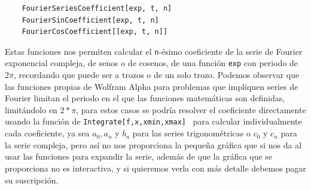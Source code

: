 \begin{verbatim}
	FourierSeriesCoefficient[exp, t, n]
	FourierSinCoefficient[exp, t, n]
	FourierCosCoefficient[[exp, t, n]]
\end{verbatim} 
Estas funciones nos permiten calcular el \texttt{n}-ésimo coeficiente de la serie de Fourier exponencial compleja, de senos o de cosenos, de una función \texttt{exp} con periodo de $2\pi$, recordando que puede ser a trozos o de un solo trozo. \newline
Podemos observar que las funciones propias de Wolfram Alpha para problemas que impliquen series de Fourier limitan el periodo en el que las funciones matemáticas son definidas, limitándolo en $2*\pi$, para estos casos se podría resolver el coeficiente directamente usando la función de \texttt{Integrate[f,{x,xmin,xmax}]}~\cite{wolframMatemathicaPiecewise} para calcular individualmente cada coeficiente, ya sea $a_0, a_n$ y $b_n$ para las series trigonométricas o $c_0$ y $c_n$ para la serie compleja, pero así no nos proporciona la pequeña gráfica que si nos da al usar las funciones para expandir la serie, además de que la gráfica que se proporciona no es interactiva, y si quieremos verla con más detalle debemos pagar su suscripción.

